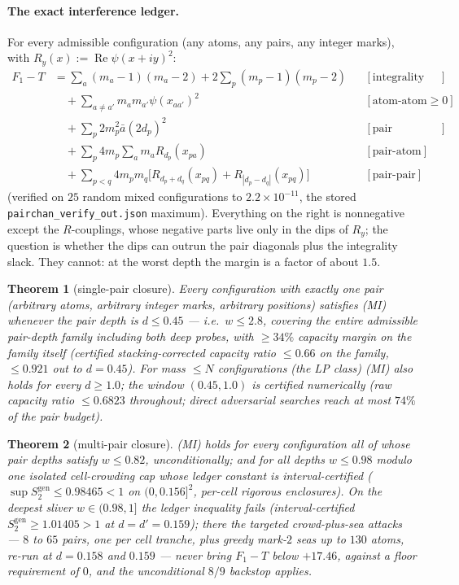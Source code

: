 \documentclass[11pt]{article}
\theoremstyle{plain}
\newtheorem{theorem}{Theorem}[section]
\theoremstyle{definition}
\theoremstyle{remark}
\newcommand{\Sgen}{S^{\mathrm{gen}}_{2}}
\begin{document}
\paragraph{The exact interference ledger.}
For every admissible configuration (any atoms, any pairs, any integer marks),
with $R_y(x) := \operatorname{Re} \psi(x + iy)^2$:
\begin{align*}
  F_1 - T
  &= \sum_a (m_a - 1)(m_a - 2) + 2 \sum_p (m_p - 1)(m_p - 2)
    && [\text{integrality slack}]\\
  &\quad + \sum_{a \ne a'} m_a m_{a'} \psi(x_{aa'})^2
    && [\text{atom-atom} \ge 0]\\
  &\quad + \sum_p 2 m_p^2 \bar{a}(2 d_p)^2
    && [\text{pair diagonals}]\\
  &\quad + \sum_p 4 m_p \sum_a m_a R_{d_p}(x_{pa})
    && [\text{pair-atom}]\\
  &\quad + \sum_{p < q} 4 m_p m_q
      \bigl[ R_{d_p + d_q}(x_{pq}) + R_{|d_p - d_q|}(x_{pq}) \bigr]
    && [\text{pair-pair}]
\end{align*}
(verified on $25$ random mixed configurations to $2.2 \times 10^{-11}$, the
stored \texttt{pairchan\_verify\_out.json} maximum). Everything on the right is
nonnegative except the $R$-couplings, whose negative parts live only in the dips
of $R_y$; the question is whether the dips can outrun the pair diagonals plus the
integrality slack. They cannot: at the worst depth the margin is a factor of
about $1.5$.

\begin{theorem}[single-pair closure]
\label{thm:singlepair}
Every configuration with exactly one pair (arbitrary atoms, arbitrary integer
marks, arbitrary positions) satisfies (MI) whenever the pair depth is
$d \le 0.45$ --- i.e.\ $w \le 2.8$, covering the entire admissible pair-depth
family
including both deep probes, with $\ge 34\%$ capacity margin on the family itself
(certified stacking-corrected capacity ratio $\le 0.66$ on the family,
$\le 0.921$ out to $d = 0.45$). For mass $\le N$ configurations (the LP class)
(MI) also holds for every $d \ge 1.0$; the window $(0.45, 1.0)$ is certified
numerically (raw capacity ratio $\le 0.6823$ throughout; direct adversarial
searches reach at most $74\%$ of the pair budget).
\end{theorem}

\begin{theorem}[multi-pair closure]
\label{thm:multipair}
(MI) holds for every configuration all of whose pair depths satisfy
$w \le 0.82$, unconditionally; and for all depths $w \le 0.98$ modulo one
isolated cell-crowding cap whose ledger constant is interval-certified
($\sup \Sgen \le 0.98465 < 1$ on $(0, 0.156]^2$, per-cell rigorous
enclosures). On the deepest sliver $w \in (0.98, 1]$ the ledger inequality fails
(interval-certified $\Sgen \ge 1.01405 > 1$ at $d = d' = 0.159$); there the
targeted crowd-plus-sea attacks --- $8$ to $65$ pairs, one per cell tranche, plus
greedy mark-$2$ seas up to $130$ atoms, re-run at $d = 0.158$ and $0.159$ ---
never bring $F_1 - T$ below $+17.46$, against a floor requirement of $0$, and the
unconditional $8/9$ backstop applies.
\end{theorem}
\end{document}

